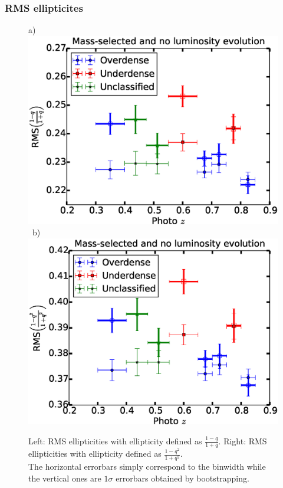 \documentclass[twocolumn,useAMS,usenatbib]{mn2e}
\begin{document}
\subsubsection{RMS ellipticites}
\begin{figure}
 a) \includegraphics[width=1.0\columnwidth]{rms_ellip1_noevolution.eps} \
 b) \includegraphics[width=1.0\columnwidth]{rms_ellip2_noevolution.eps} \\
 \caption{Left: RMS ellipticities with ellipticity defined as $\frac{1-q}{1+q}$. \; 
          Right: RMS ellipticities with ellipticity defined as $\frac{1-q^2}{1+q^2}$.\\ The horizontal errorbars simply correspond to the binwidth while the vertical ones
          are $1\sigma$ errorbars obtained by bootstrapping.}
 \label{fig:rms_ellip}
\end{figure}
\end{document}
